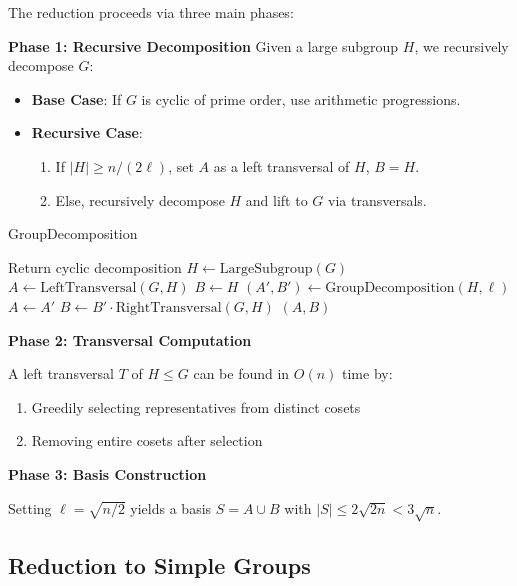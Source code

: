 \documentclass[sigconf]{acmart}
\begin{document}
The reduction proceeds via three main phases:

\textbf{Phase 1: Recursive Decomposition}
Given a large subgroup $H$, we recursively decompose $G$:
\begin{itemize}
    \item \textbf{Base Case}: If $G$ is cyclic of prime order, use arithmetic progressions.
    \item \textbf{Recursive Case}:
    \begin{enumerate}
        \item If $|H| \geq n/(2\ell)$, set $A$ as a left transversal of $H$, $B = H$.
        \item Else, recursively decompose $H$ and lift to $G$ via transversals.
    \end{enumerate}
\end{itemize}

\begin{algorithm}[H]
\caption{GroupDecomposition}
\begin{algorithmic}[1]
    \STATE Return cyclic decomposition
\ELSE
    \STATE $H \gets \text{LargeSubgroup}(G)$
        \STATE $A \gets \text{LeftTransversal}(G,H)$
        \STATE $B \gets H$
    \ELSE
        \STATE $(A',B') \gets \text{GroupDecomposition}(H,\ell)$
        \STATE $A \gets A'$
        \STATE $B \gets B' \cdot \text{RightTransversal}(G,H)$
    \ENDIF
\ENDIF
\RETURN $(A,B)$
\end{algorithmic}
\end{algorithm}

\textbf{Phase 2: Transversal Computation}
\begin{lemma}
A left transversal $T$ of $H \leq G$ can be found in $O(n)$ time by:
\begin{enumerate}
    \item Greedily selecting representatives from distinct cosets
    \item Removing entire cosets after selection
\end{enumerate}
\end{lemma}

\textbf{Phase 3: Basis Construction}
\begin{corollary}
Setting $\ell = \sqrt{n/2}$ yields a basis $S = A \cup B$ with $|S| \leq 2\sqrt{2n} < 3\sqrt{n}$.
\end{corollary}


\subsection{Reduction to Simple Groups}
\label{sec:simple-groups}
\end{document}
